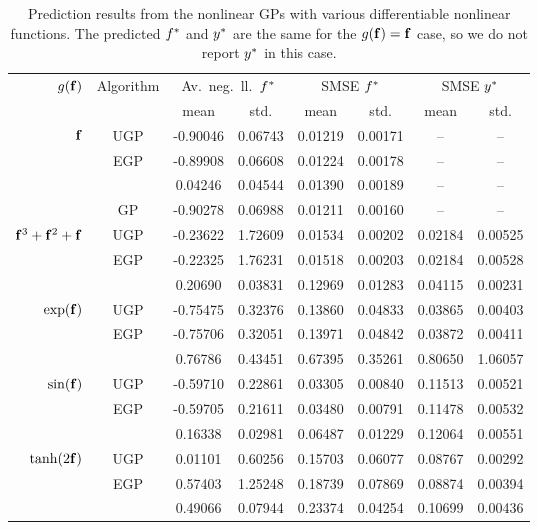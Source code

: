 \documentclass{article} %
\begin{document}
\begin{table}[tb]
    \centering
    \caption[]{Prediction results from the nonlinear GPs with various 
        differentiable nonlinear functions. The predicted $f^{*}$ and 
        $y^{*}$ are the same for the $g\!\left({{\mathbf{f}}}\right) = \mathbf{f}$ case, so
        we do not report $y^{*}$ in this case.}
    \footnotesize
    \begin{tabular}{r|c| c c c c c c}
        \multirow{2}{*}{$g\!\left({{\mathbf{f}}}\right)$} & \multirow{2}{*}{Algorithm} & 
            \multicolumn{2}{c}{Av.\ neg.\ ll.\ $f^{*}$} &
            \multicolumn{2}{c}{SMSE $f^{*}$} &
            \multicolumn{2}{c}{SMSE $y^{*}$} \\
        & & mean & std. & mean & std. & mean & std.\\
        \toprule
        $\mathbf{f}$ 
& UGP & -0.90046 & 0.06743 & 0.01219 & 0.00171 & -- & -- \\
& EGP & -0.89908 & 0.06608 & 0.01224 & 0.00178 & -- & -- \\
& \cite{Opper2009} & 0.04246 & 0.04544 & 0.01390 & 0.00189 & -- & -- \\
& GP & -0.90278 & 0.06988 & 0.01211 & 0.00160 & -- & -- \\
        \midrule
        $\mathbf{f}^3 + \mathbf{f}^2 + \mathbf{f}$ 
& UGP & -0.23622 & 1.72609 & 0.01534 & 0.00202 & 0.02184 & 0.00525 \\
& EGP & -0.22325 & 1.76231 & 0.01518 & 0.00203 & 0.02184 & 0.00528 \\
& \cite{Opper2009} & 0.20690 & 0.03831 & 0.12969 & 0.01283 & 0.04115 & 0.00231 \\
        \midrule
        $\exp\!\left({\mathbf{f}}\right)$ 
& UGP & -0.75475 & 0.32376 & 0.13860 & 0.04833 & 0.03865 & 0.00403 \\
& EGP & -0.75706 & 0.32051 & 0.13971 & 0.04842 & 0.03872 & 0.00411 \\
& \cite{Opper2009} & 0.76786 & 0.43451 & 0.67395 & 0.35261 & 0.80650 & 1.06057 \\
        \midrule
        $\sin\!\left({\mathbf{f}}\right)$ 
& UGP & -0.59710 & 0.22861 & 0.03305 & 0.00840 & 0.11513 & 0.00521 \\
& EGP & -0.59705 & 0.21611 & 0.03480 & 0.00791 & 0.11478 & 0.00532 \\
& \cite{Opper2009} & 0.16338 & 0.02981 & 0.06487 & 0.01229 & 0.12064 & 0.00551 \\
        \midrule
        $\tanh\!\left({2\mathbf{f}}\right)$
& UGP & 0.01101 & 0.60256 & 0.15703 & 0.06077 & 0.08767 & 0.00292 \\
& EGP & 0.57403 & 1.25248 & 0.18739 & 0.07869 & 0.08874 & 0.00394 \\
& \cite{Opper2009} & 0.49066 & 0.07944 & 0.23374 & 0.04254 & 0.10699 & 0.00436 \\
        \bottomrule
    \end{tabular}
    \label{tab:toy}
\end{table}
\end{document}

